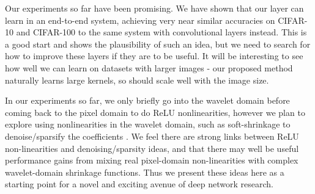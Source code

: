 Our experiments so far have been promising. We have shown that our layer can
learn in an end-to-end system, achieving very near similar accuracies on
CIFAR-10 and CIFAR-100 to the same system with convolutional layers instead.
This is a good start and shows the plausibility of such an idea, but we need to
search for how to improve these layers if they are to be useful.  It will be
interesting to see how well we can learn on datasets with larger images - our
proposed method naturally learns large kernels, so should scale well with the
image size.

In our experiments so far, we only briefly go into the wavelet domain before
coming back to the pixel domain to do ReLU nonlinearities, however we plan to
explore using nonlinearities in the wavelet domain, such as soft-shrinkage to
denoise/sparsify the coefficients \cite{donoho_ideal_1994}. We feel there are
strong links between ReLU non-linearities and denoising/sparsity ideas, and that
there may well be useful performance gains from mixing real pixel-domain
non-linearities with complex wavelet-domain shrinkage functions. Thus we present
these ideas here as a starting point for a novel and exciting avenue of deep
network research.
